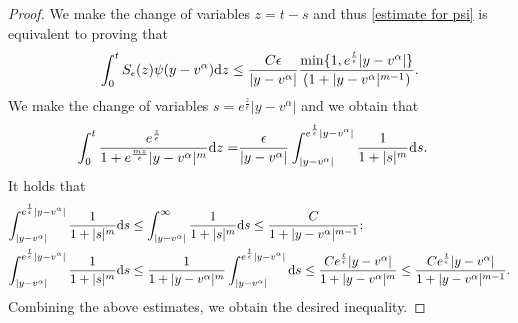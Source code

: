 \documentclass[11pt]{article}
\numberwithin{equation}{section}
\newcommand{\der}{\textup{d}}
\begin{document}
\begin{proof}
 We make the change of variables $z=t-s$ and thus \eqref{estimate for psi} is equivalent to proving that
\begin{align*}
    \int_{0}^{t}S_{\epsilon}(z) \psi(y-v^{\alpha})\der z\leq \frac{C\epsilon}{|y-v^{\alpha}|}\frac{\min\{1,e^{\frac{t}{\epsilon}}|y-v^{\alpha}|\}}{(1+|y-v^{\alpha}|^{m-1})}.
\end{align*}
We make the change of variables $s=e^{\frac{z}{\epsilon}}|y-v^{\alpha}|$ and we obtain that
\begin{align*}
    \int_{0}^{t}\frac{e^{\frac{z}{\epsilon}}}{1+e^{\frac{mz}{\epsilon}}|y-v^{\alpha}|^{m}} \der z=&\frac{\epsilon}{|y-v^{\alpha}|}\int_{|y-v^{\alpha}|}^{e^{\frac{t}{\epsilon}}|y-v^{\alpha}|}\frac{1}{1+|s|^{m}}\der s.
\end{align*}
It holds that
\begin{align}
           \int_{|y-v^{\alpha}|}^{e^{\frac{t}{\epsilon}}|y-v^{\alpha}|}\frac{1}{1+|s|^{m}}\der s&\leq  \int_{|y-v^{\alpha}|}^{\infty}\frac{1}{1+|s|^{m}}\der s\leq \frac{C}{1+|y-v^{\alpha}|^{m-1}};\label{part1}\\
                     \int_{|y-v^{\alpha}|}^{e^{\frac{t}{\epsilon}}|y-v^{\alpha}|}\frac{1}{1+|s|^{m}}\der s&\leq \frac{1}{1+|y-v^{\alpha}|^{m}}  \int_{|y-v^{\alpha}|}^{e^{\frac{t}{\epsilon}}|y-v^{\alpha}|}\der s\leq \frac{Ce^{\frac{t}{\epsilon}}|y-v^{\alpha}|}{1+|y-v^{\alpha}|^{m}} \leq \frac{Ce^{\frac{t}{\epsilon}}|y-v^{\alpha}|}{1+|y-v^{\alpha}|^{m-1}}.\label{part2}
\end{align}
Combining the above estimates, we obtain the desired inequality.
\end{proof}
\end{document}
